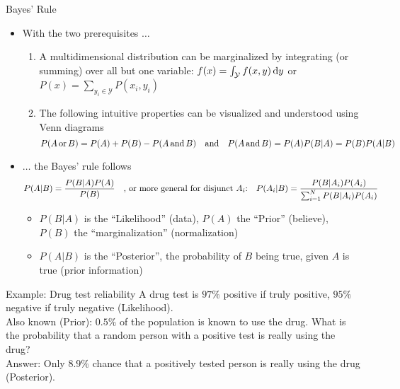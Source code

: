   \begin{frame}{Bayes' Rule}
    \begin{itemize}
      \item With the two prerequisites $\dots$
        \begin{enumerate}
          \item A multidimensional distribution can be marginalized by integrating (or summing) over all but one variable: $f(x) = \int_\mathcal{Y}f(x,y)\,\mathrm{d}y$ or $P(x) = \sum_{y_i\in\mathcal{Y}} P(x_i, y_i)$
          \item The following intuitive properties can be visualized and understood using Venn diagrams
            \begin{equation*}
              P(A\,\text{or}\,B) = P(A) + P(B) - P(A\,\text{and}\,B)
              \quad\text{and}\quad
              P(A\,\text{and}\,B) = P(A) P(B|A) = P(B) P(A|B)
            \end{equation*}
        \end{enumerate}
      \item $\dots$ the Bayes' rule follows
        \begin{equation*}
          P(A|B) = \frac{P(B|A) P(A)}{P(B)}
          \quad\text{, or more general for disjunct $A_i$:}\quad
          P(A_i|B) = \frac{P(B|A_i) P(A_i)}{\sum_{i=1}^N P(B|A_i)P(A_i)}
        \end{equation*}
        \begin{itemize}
          \item $P(B|A)$ is the \enquote{Likelihood} (data), $P(A)$ the \enquote{Prior} (believe), $P(B)$ the \enquote{marginalization} (normalization)
          \item $P(A|B)$ is the \enquote{Posterior}, the probability of $B$ being true, given $A$ is true (prior information)
        \end{itemize}
    \end{itemize}
    \vfill
    \begin{exampleblock}{Example: Drug test reliability}
      A drug test is $97\%$ positive if truly positive, $95\%$ negative if truly negative (Likelihood). \\
      Also known (Prior): $0.5\%$ of the population is known to use the drug. What is the probability that a random person with a positive test is really using the drug? \\
      Answer: Only $8.9\%$ chance that a positively tested person is really using the drug (Posterior).
    \end{exampleblock}
  \end{frame}

